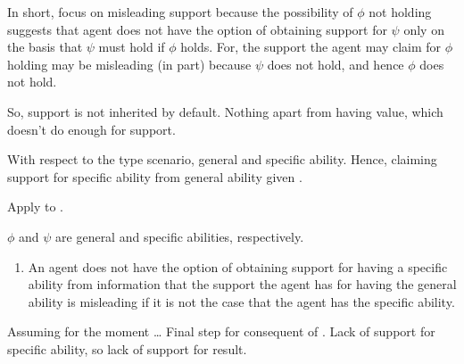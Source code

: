 \begin{note}[Summarising]
  In short, focus on misleading support because the possibility of \(\phi\) not holding suggests that agent does not have the option of obtaining support for \(\psi\) only on the basis that \(\psi\) must hold if \(\phi\) holds.
  For, the support the agent may claim for \(\phi\) holding may be misleading (in part) because \(\psi\) does not hold, and hence \(\phi\) does not hold.

  So, support is not inherited by default.
  Nothing apart from having value, which doesn't do enough for support.
\end{note}

\newpage

\begin{note}
  With respect to the type scenario, general and specific ability.
  Hence, claiming support for specific ability from general ability given \gsi{}.

  Apply to \AR{}.

  \(\phi\) and \(\psi\) are general and specific abilities, respectively.

  \begin{enumerate}[label=\nI{}, ref=\nI{}]
  \item An agent does not have the option of obtaining support for having a specific ability from information that the support the agent has for having the general ability is misleading if it is not the case that the agent has the specific ability.
  \end{enumerate}

  Assuming for the moment \dots
  Final step for consequent of \mcB{}.
  Lack of support for specific ability, so lack of support for result.
\end{note}

